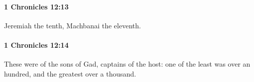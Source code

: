 		\paragraph{1 Chronicles 12:13} %
			\label{1CHRONICLES-12-13}

			Jeremiah the tenth, Machbanai the eleventh.


		\paragraph{1 Chronicles 12:14} %
			\label{1CHRONICLES-12-14}

			These were of the sons of Gad, captains of the host: one of the least was over an hundred, and the greatest over a thousand.


